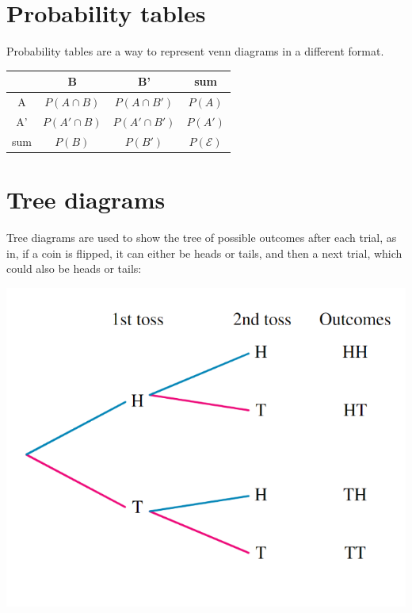 \documentclass{book}
\begin{document}
\section{Probability tables}
Probability tables are a way to represent venn diagrams in a different format.
\begin{center}
	\begin{tabular}{c|c|c|c}
		    & B              & B'              & sum              \\ \hline
		A   & $P(A \cap B)$  & $P(A \cap B')$  & $P(A)$           \\ \hline
		A'  & $P(A' \cap B)$ & $P(A' \cap B')$ & $P(A')$          \\ \hline
		sum & $P(B)$         & $P(B')$         & $P(\mathcal{E})$
	\end{tabular}
\end{center}

\section{Tree diagrams}
Tree diagrams are used to show the tree of possible outcomes after each trial, as in, if a coin is flipped, it can either be heads or tails, and then a next trial, which could also be heads or tails:
\begin{center}
	\includegraphics[scale=0.5]{tree diagrams}
\end{center}
\end{document}
